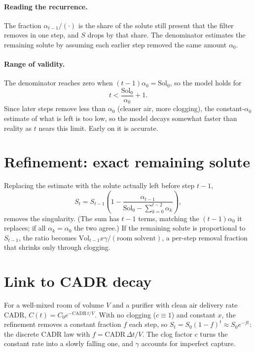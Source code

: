 \documentclass[11pt]{article}
\begin{document}
\paragraph{Reading the recurrence.} The fraction $\alpha_{t-1}/(\cdot)$ is the share of the solute still present that the filter removes in one step, and $S$ drops by that share. The denominator estimates the remaining solute by assuming each earlier step removed the same amount $\alpha_0$.

\paragraph{Range of validity.} The denominator reaches zero when $(t-1)\alpha_0=\mathrm{Sol}_0$, so the model holds for
\[ t<\frac{\mathrm{Sol}_0}{\alpha_0}+1. \]
Since later steps remove less than $\alpha_0$ (cleaner air, more clogging), the constant-$\alpha_0$ estimate of what is left is too low, so the model decays somewhat faster than reality as $t$ nears this limit. Early on it is accurate.

\section{Refinement: exact remaining solute}
Replacing the estimate with the solute actually left before step $t-1$,
\begin{equation}\label{eq:ref}
S_t=S_{t-1}\left(1-\frac{\alpha_{t-1}}{\mathrm{Sol}_0-\sum_{k=0}^{t-2}\alpha_k}\right),
\end{equation}
removes the singularity. (The sum has $t-1$ terms, matching the $(t-1)\alpha_0$ it replaces; if all $\alpha_k=\alpha_0$ the two agree.) If the remaining solute is proportional to $S_{t-1}$, the ratio becomes $\mathrm{Vol}_{t-1}x\gamma/(\text{room solvent})$, a per-step removal fraction that shrinks only through clogging.

\section{Link to CADR decay}
For a well-mixed room of volume $V$ and a purifier with clean air delivery rate CADR, $C(t)=C_0e^{-\mathrm{CADR}\,t/V}$. With no clogging ($c\equiv1$) and constant $x$, the refinement removes a constant fraction $f$ each step, so $S_t=S_0(1-f)^t\approx S_0e^{-ft}$: the discrete CADR law with $f=\mathrm{CADR}\,\Delta t/V$. The clog factor $c$ turns the constant rate into a slowly falling one, and $\gamma$ accounts for imperfect capture.
\end{document}
